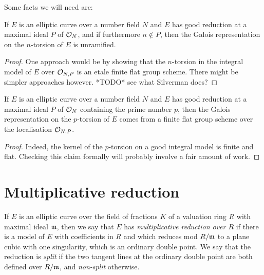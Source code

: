 Some facts we will need are:

\begin{theorem}\label{good_reduction_implies_unramified} If $E$ is an elliptic curve over a number 
  field $N$ and $E$ has good reduction at a maximal ideal $P$ of $\mathcal{O}_N$, and if furthermore 
  $n\not\in P$, then the Galois representation on the $n$-torsion of $E$ is unramified.
\end{theorem}
\begin{proof}
  One approach would be by showing that the $n$-torsion in the integral model of $E$ over $\mathcal{O}_{N,P}$
  is an etale finite flat group scheme. There might be simpler approaches however.
  *TODO* see what Silverman does?
\end{proof}

\begin{theorem}\label{good_reduction_implies_flat} If $E$ is an elliptic curve over a number field 
  $N$ and $E$ has good reduction at a maximal ideal $P$ of $\mathcal{O}_N$ containing the prime number $p$, 
  then the Galois representation on the $p$-torsion of $E$ comes from a finite flat group scheme 
  over the localisation $\mathcal{O}_{N,P}$.
\end{theorem}
\begin{proof}
  Indeed, the kernel of the $p$-torsion on a good integral model is finite and flat.
  Checking this claim formally will probably involve a fair amount of work.
\end{proof}

\section{Multiplicative reduction}

If $E$ is an elliptic curve over the field of fractions $K$ of a valuation ring $R$ with maximal ideal $\mathfrak{m}$,
then we say that $E$ has \emph{multiplicative reduction over $R$} if there is a model of $E$
with coefficients in $R$ and which reduces mod $R/\mathfrak{m}$ to a plane cubic with one singularity, which is an ordinary double point.
We say that the reduction is \emph{split} if the two tangent lines at the ordinary double point
are both defined over $R/\mathfrak{m}$, and \emph{non-split} otherwise.

